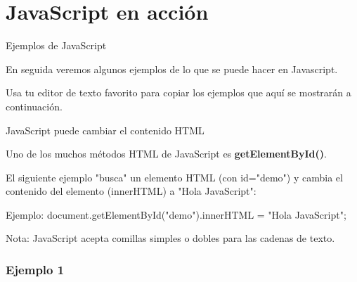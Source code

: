 \section{JavaScript en acción}

\begin{frame}[c]{Ejemplos de JavaScript}

  En seguida veremos algunos ejemplos de lo que se puede hacer en
  Javascript.

  \vspace{\baselineskip}
  Usa tu editor de texto favorito para copiar los ejemplos que aquí se
  mostrarán a continuación.
\end{frame}

\begin{frame}[c]{JavaScript puede cambiar el contenido HTML}

  Uno de los muchos métodos HTML de JavaScript es \textbf{getElementById()}.

  El siguiente ejemplo "busca" un elemento HTML (con id="demo") y cambia el
  contenido del elemento (innerHTML) a "Hola JavaScript":

  \vspace{\baselineskip}
  \begin{exampleblock}{Ejemplo:}
     document.getElementById("demo").innerHTML = "Hola JavaScript";
  \end{exampleblock}

  \vspace{\baselineskip}
  \begin{alertblock}{Nota:}
    JavaScript acepta comillas simples o dobles para las cadenas de texto.
  \end{alertblock}
\end{frame}

\begin{frame}[fragile]
  \frametitle{Ejemplo 1}
  
\end{frame}
